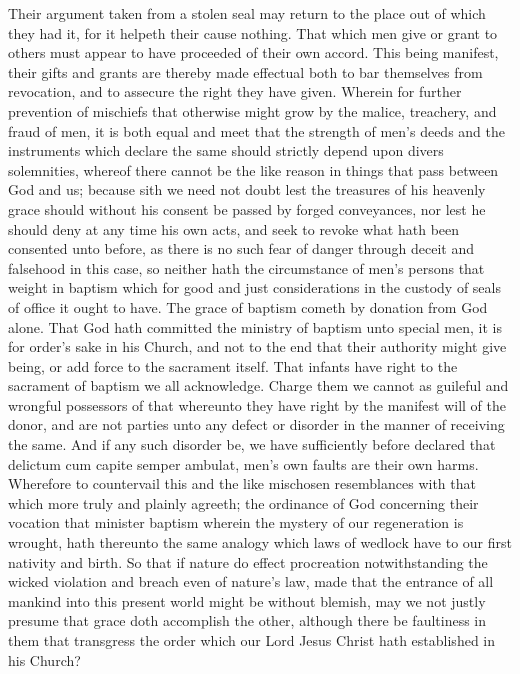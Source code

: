 Their argument taken from a stolen seal may return to the place out of which they had it, for it helpeth their cause nothing. That which men give or grant to others must appear to have proceeded of their own accord. This being manifest, their gifts and grants are thereby made effectual both to bar themselves from revocation, and to assecure the right they  have given. Wherein for further prevention of mischiefs that otherwise might grow by the malice, treachery, and fraud of men, it is both equal and meet that the strength of men’s deeds and the instruments which declare the same should strictly depend upon divers solemnities, whereof there cannot be the like reason in things that pass between God and us; because sith we need not doubt lest the treasures of his heavenly grace should without his consent be passed by forged conveyances, nor lest he should deny at any time his own acts, and seek to revoke what hath been consented unto before, as there is no such fear of danger through deceit and falsehood in this case, so neither hath the circumstance of men’s persons that weight in baptism which for good and just considerations in the custody of seals of office it ought to have. The grace of baptism cometh by donation from God alone. That God hath committed the ministry of baptism unto special men, it is for order’s sake in his Church, and not to the end that their authority might give being, or add force to the sacrament itself. That infants have right to the sacrament of baptism we all acknowledge. Charge them we cannot as guileful and wrongful possessors of that whereunto they have right by the manifest will of the donor, and are not parties unto any defect or disorder in the manner of receiving the same. And if any such disorder be, we have sufficiently before declared that delictum cum capite semper ambulat, men’s own faults are their own harms.
Wherefore to countervail this and the like mischosen resemblances with that which more truly and plainly agreeth; the ordinance of God concerning their vocation that minister baptism wherein the mystery of our regeneration is wrought, hath thereunto the same analogy which laws of wedlock have to our first nativity and birth. So that if nature do effect procreation notwithstanding the wicked violation and breach even of nature’s law, made that the entrance of all mankind into this present world might be without blemish, may we not justly presume that grace doth accomplish the other, although there be faultiness in them that transgress the order which our Lord Jesus Christ hath established in his Church?
